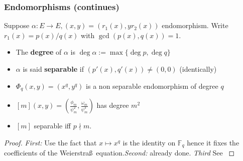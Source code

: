 \documentclass[12pt,handout]{beamer} %
\newcommand{\F}{\mathbb F}
\theoremstyle{definition}
\begin{document}
\begin{frame}
\frametitle{Endomorphisms (continues)}

\begin{definition} Suppose $\alpha: E\rightarrow E, (x,y)=(r_1(x),yr_2(x))$ endomorphism. Write
$r_1(x)=p(x)/q(x)$ with $\gcd(p(x),q(x))=1$.
\begin{itemize}[<+-| alert@+>]
  \item The \textbf{degree} of $\alpha$ is $\deg\alpha:=\max\{\deg p,\deg q\}$
  \item $\alpha$ is said \textbf{separable} if $(p'(x),q'(x))\neq(0,0)$ \hfill (identically)
\end{itemize}
\end{definition}\pause

\begin{lemma}
\begin{itemize}[<+-|alert@+>]
\item $\Phi_q(x,y)=(x^q,y^q)$ is a non separable endomorphism of degree $q$
\item $[m](x,y)=\left(\frac{\phi_m}{\psi_m^2},\frac{\omega_m}{\psi^3_m}\right)$ has degree $m^2$
\item $[m]$ separable iff $p\nmid m$.
\end{itemize}
\end{lemma}\pause

\begin{proof}
\alert{\emph{First:}} Use the fact that $x\mapsto x^q$ is the identity on $\F_q$ hence it
fixes the coefficients of the Weierstra\ss\ equation.\pause \alert{\emph{Second:}} already done.
\pause \alert{\emph{Third}} See \cite[Proposition 2.28]{washington}
\end{proof}
\end{frame}
\end{document}
